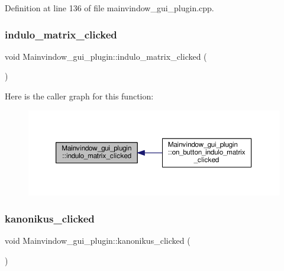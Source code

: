 Definition at line 136 of file mainvindow\+\_\+gui\+\_\+plugin.\+cpp.

\mbox{\label{classMainvindow__gui__plugin_a9f1289a2d061b153834961a41e442a35}} 
\subsubsection{\texorpdfstring{indulo\+\_\+matrix\+\_\+clicked}{indulo\_matrix\_clicked}}
{\footnotesize\ttfamily void Mainvindow\+\_\+gui\+\_\+plugin\+::indulo\+\_\+matrix\+\_\+clicked (\begin{DoxyParamCaption}{ }\end{DoxyParamCaption})\hspace{0.3cm}{\ttfamily [signal]}}

Here is the caller graph for this function\+:\nopagebreak
\begin{figure}[H]
\begin{center}
\leavevmode
\includegraphics[width=350pt]{classMainvindow__gui__plugin_a9f1289a2d061b153834961a41e442a35_icgraph}
\end{center}
\end{figure}
\mbox{\label{classMainvindow__gui__plugin_aacc5de871594914c5d4c8edcec6576a8}} 
\subsubsection{\texorpdfstring{kanonikus\+\_\+clicked}{kanonikus\_clicked}}
{\footnotesize\ttfamily void Mainvindow\+\_\+gui\+\_\+plugin\+::kanonikus\+\_\+clicked (\begin{DoxyParamCaption}{ }\end{DoxyParamCaption})\hspace{0.3cm}{\ttfamily [signal]}}

